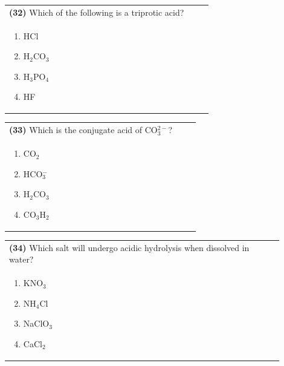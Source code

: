 \documentclass{article}
\begin{document}
\noindent\begin{tabular}{|p{0.9\linewidth}|}
\hline
\textbf{(32)} Which of the following is a triprotic acid? \\[0.2cm]
\begin{minipage}{0.85\linewidth}
\begin{enumerate}[label=\alph*.]
\item HCl \item H$_2$CO$_3$ \item H$_3$PO$_4$ \item HF
\end{enumerate}
\end{minipage}\\[0.2cm]
\hline
\end{tabular}
\newpage

\noindent\begin{tabular}{|p{0.9\linewidth}|}
\hline
\textbf{(33)} Which is the conjugate acid of CO$_3^{2-}$? \\[0.2cm]
\begin{minipage}{0.85\linewidth}
\begin{enumerate}[label=\alph*.]
\item CO$_2$ \item HCO$_3^-$ \item H$_2$CO$_3$ \item CO$_3$H$_2$
\end{enumerate}
\end{minipage}\\[0.2cm]
\hline
\end{tabular}

\noindent\begin{tabular}{|p{0.9\linewidth}|}
\hline
\textbf{(34)} Which salt will undergo acidic hydrolysis when dissolved in water? \\[0.2cm]
\begin{minipage}{0.85\linewidth}
\begin{enumerate}[label=\alph*.]
\item KNO$_3$ \item NH$_4$Cl \item NaClO$_3$ \item CaCl$_2$
\end{enumerate}
\end{minipage}\\[0.2cm]
\hline
\end{tabular}
\end{document}
